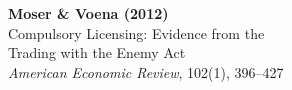 \documentclass[12pt]{article}
\begin{document}
\begin{center}
{\Large\bfseries Moser \& Voena (2012)}\\
{\large Compulsory Licensing: Evidence from the}\\
{\large Trading with the Enemy Act}\\
\vspace{0.5em}
{\normalsize \textit{American Economic Review}, 102(1), 396--427}
\end{center}

\vspace{1em}




\end{document}
